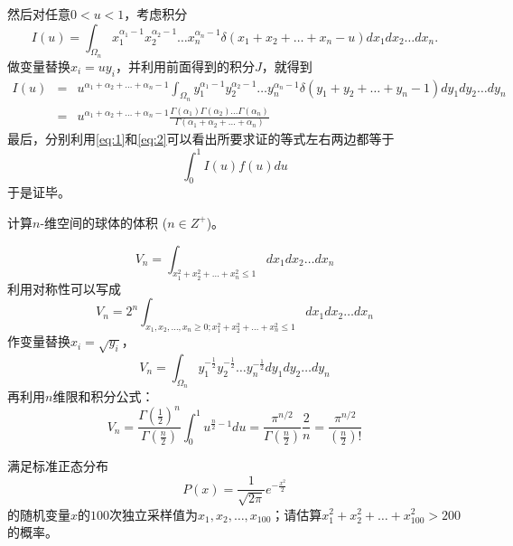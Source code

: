 \documentclass[CJK]{beamer}
\begin{document}
\begin{frame}
  \bch
      {\scriptsize
        然后对任意$0<u<1$，考虑积分
        \begin{equation}
        I(u)= \int_{\Omega_n} x_1^{\alpha_1-1}x_2^{\alpha_2-1}\ldots x_n^{\alpha_n-1} \delta(x_1+x_2+\ldots+x_n-u) dx_1dx_2\ldots dx_n.\label{eq:1}
        \end{equation}
        做变量替换$x_i = uy_i$，并利用前面得到的积分$J$，就得到
        \begin{eqnarray}
        I(u) &=& u^{\alpha_1+\alpha_2+\ldots+\alpha_n-1} \int_{\Omega_n} y_1^{\alpha_1-1}y_2^{\alpha_2-1}\ldots y_n^{\alpha_n-1} \delta(y_1+y_2+\ldots+y_n-1) dy_1dy_2\ldots dy_n \nonumber \\
        &=& u^{\alpha_1+\alpha_2+\ldots+\alpha_n-1} \frac{\Gamma(\alpha_1)\Gamma(\alpha_2)\ldots \Gamma(\alpha_n)}{\Gamma(\alpha_1+\alpha_2+\ldots + \alpha_n)} \label{eq:2}
        \end{eqnarray}
        最后，分别利用\eqref{eq:1}和\eqref{eq:2}可以看出所要求证的等式左右两边都等于
        $$ \int_0^1 I(u) f(u) du $$
        于是证毕。
        }
  \ech
\end{frame}

\begin{frame}
  \chtitle{\proid (\stwo)}
  \bch
  计算$n$-维空间的球体的体积 ($n\in Z^+$)。
  \ech
\end{frame}

\begin{frame}
  \bch
  {\small
  $$ V_n = \int_{x_1^2+x_2^2+\ldots +x_n^2\le 1} dx_1 dx_2 \ldots dx_n  $$
  利用对称性可以写成
  $$ V_n = 2^n\int_{x_1,x_2,\ldots,x_n\ge 0; x_1^2+x_2^2+\ldots +x_n^2\le 1} dx_1 dx_2 \ldots dx_n  $$
  作变量替换$x_i = \sqrt{y_i}$，
  $$  V_n = \int_{\Omega_n} y_1^{-\frac{1}{2}}y_2^{-\frac{1}{2}}\ldots y_n^{-\frac{1}{2}}dy_1 dy_2 \ldots dy_n  $$
  再利用$n$维限和积分公式：
$$V_n = \frac{\Gamma\left(\frac{1}{2}\right)^n}{\Gamma\left(\frac{n}{2}\right)}\int_0^1 u^{\frac{n}{2}-1} du = \frac{\pi^{n/2}}{\Gamma\left(\frac{n}{2}\right)}\frac{2}{n} = \frac{\pi^{n/2}}{\left(\frac{n}{2}\right)!} $$}
  \ech
\end{frame}

\begin{frame}
  \chtitle{\proid (\sfour)}
  \bch
  满足标准正态分布$$P(x) = \frac{1}{\sqrt{2\pi}}e^{-\frac{x^2}{2}}$$的随机变量$x$的$100$次独立采样值为$x_1,x_2,\ldots, x_{100}$；请估算$x_1^2+x_2^2+\ldots +x_{100}^2 > 200 $ 的概率。
  \ech
\end{frame}
\end{document}
